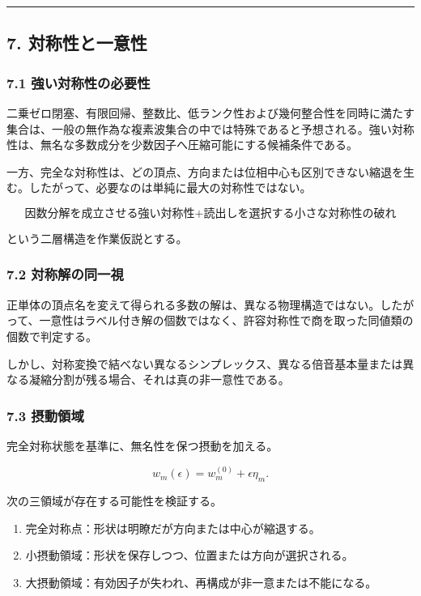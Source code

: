 \documentclass[
  a4paper,
]{ltjsarticle}
\providecommand{\tightlist}{%
  \setlength{\itemsep}{0pt}\setlength{\parskip}{0pt}}
\begin{document}
\begin{center}\rule{0.5\linewidth}{0.5pt}\end{center}

\subsection{7.
対称性と一意性}\label{ux5bfeux79f0ux6027ux3068ux4e00ux610fux6027}

\subsubsection{7.1
強い対称性の必要性}\label{ux5f37ux3044ux5bfeux79f0ux6027ux306eux5fc5ux8981ux6027}

二乗ゼロ閉塞、有限回帰、整数比、低ランク性および幾何整合性を同時に満たす集合は、一般の無作為な複素波集合の中では特殊であると予想される。強い対称性は、無名な多数成分を少数因子へ圧縮可能にする候補条件である。

一方、完全な対称性は、どの頂点、方向または位相中心も区別できない縮退を生む。したがって、必要なのは単純に最大の対称性ではない。

\[
\text{因数分解を成立させる強い対称性}
+
\text{読出しを選択する小さな対称性の破れ}
\]

という二層構造を作業仮説とする。

\subsubsection{7.2
対称解の同一視}\label{ux5bfeux79f0ux89e3ux306eux540cux4e00ux8996}

正単体の頂点名を変えて得られる多数の解は、異なる物理構造ではない。したがって、一意性はラベル付き解の個数ではなく、許容対称性で商を取った同値類の個数で判定する。

しかし、対称変換で結べない異なるシンプレックス、異なる倍音基本量または異なる凝縮分割が残る場合、それは真の非一意性である。

\subsubsection{7.3 摂動領域}\label{ux6442ux52d5ux9818ux57df}

完全対称状態を基準に、無名性を保つ摂動を加える。

\[
w_m(\epsilon)
=
w_m^{(0)}+\epsilon\eta_m.
\]

次の三領域が存在する可能性を検証する。

\begin{enumerate}
\def\labelenumi{\arabic{enumi}.}
\tightlist
\item
  完全対称点：形状は明瞭だが方向または中心が縮退する。
\item
  小摂動領域：形状を保存しつつ、位置または方向が選択される。
\item
  大摂動領域：有効因子が失われ、再構成が非一意または不能になる。
\end{enumerate}
\end{document}
